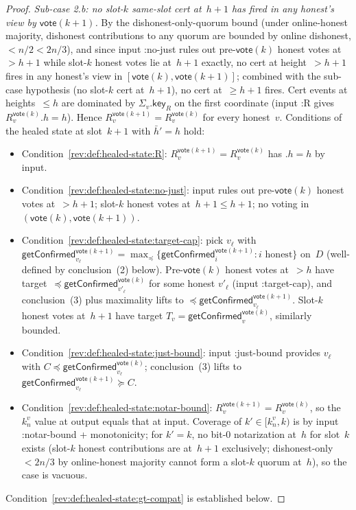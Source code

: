 \ifx\litemode\undefined\documentclass{article}\fi
\newcommand{\key}{\mathsf{key}}
\newcommand{\vote}{\mathsf{vote}}
\newcommand{\comm}[1]{\bar{#1}}
\newcommand{\getConfirmed}{\textsf{getConfirmed}\xspace}
\theoremstyle{plain}
\theoremstyle{definition}
\theoremstyle{remark}
\newcommand{\OHM}{online-honest majority\xspace}
\begin{document}
\begin{proof}
\emph{Sub-case 2.b: no slot-$k$ same-slot cert at~$h+1$ has fired in any honest's view by $\vote(k+1)$.}
By the dishonest-only-quorum bound (under \OHM, dishonest contributions to any quorum are bounded by online dishonest, $<n/2 < 2n/3$), and since input :no-just rules out pre-$\vote(k)$ honest votes at~$>h+1$ while slot-$k$ honest votes lie at~$h+1$ exactly, no cert at height~$>h+1$ fires in any honest's view in $[\vote(k),\vote(k+1)]$; combined with the sub-case hypothesis (no slot-$k$ cert at~$h+1$), no cert at~$\geq h+1$ fires. Cert events at heights~$\leq h$ are dominated by $\Sigma_v.\key_R$ on the first coordinate (input :R gives $R_v^{\vote(k)}.h = h$). Hence $R_v^{\vote(k+1)} = R_v^{\vote(k)}$ for every honest~$v$. Conditions of the healed state at slot~$k+1$ with $\comm{h}' = h$ hold:
\begin{itemize}
  \item Condition~\ref{rev:def:healed-state:R}: $R_v^{\vote(k+1)} = R_v^{\vote(k)}$ has $.h = h$ by input.
  \item Condition~\ref{rev:def:healed-state:no-just}: input rules out pre-$\vote(k)$ honest votes at~$>h+1$; slot-$k$ honest votes at~$h+1 \leq h+1$; no voting in $(\vote(k),\vote(k+1))$.
  \item Condition~\ref{rev:def:healed-state:target-cap}: pick $v_\ell$ with $\getConfirmed_{v_\ell}^{\vote(k+1)} = \max_\preceq \{\getConfirmed_i^{\vote(k+1)} : i \text{ honest}\}$ on~$D$ (well-defined by conclusion~(2) below). Pre-$\vote(k)$ honest votes at~$>h$ have target~$\preceq \getConfirmed_{v'_\ell}^{\vote(k)}$ for some honest $v'_\ell$ (input :target-cap), and conclusion~(3) plus maximality lifts to $\preceq \getConfirmed_{v_\ell}^{\vote(k+1)}$. Slot-$k$ honest votes at~$h+1$ have target $T_v = \getConfirmed_v^{\vote(k)}$, similarly bounded.
  \item Condition~\ref{rev:def:healed-state:just-bound}: input :just-bound provides $v_\ell$ with $C \preceq \getConfirmed_{v_\ell}^{\vote(k)}$; conclusion~(3) lifts to $\getConfirmed_{v_\ell}^{\vote(k+1)} \succeq C$.
  \item Condition~\ref{rev:def:healed-state:notar-bound}: $R_v^{\vote(k+1)} = R_v^{\vote(k)}$, so the $k_n^v$ value at output equals that at input. Coverage of $k' \in [k_n^v, k)$ is by input :notar-bound + monotonicity; for $k' = k$, no bit-$0$ notarization at~$h$ for slot~$k$ exists (slot-$k$ honest contributions are at~$h+1$ exclusively; dishonest-only $<2n/3$ by \OHM cannot form a slot-$k$ quorum at~$h$), so the case is vacuous.
\end{itemize}
Condition~\ref{rev:def:healed-state:gt-compat} is established below.


\end{proof}
\end{document}
